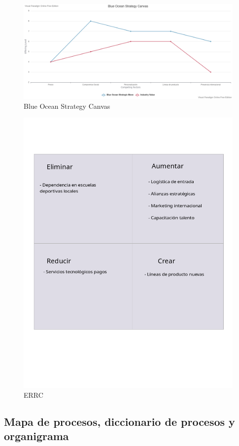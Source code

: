 \documentclass[11pt]{article}
\begin{document}
\begin{figure}[H]
\centering
\includegraphics[width=.9\linewidth]{./assets/build/blue_ocean_canvas.png}
\caption{\label{fig:blue_ocean}Blue Ocean Strategy Canvas}
\end{figure}
\begin{figure}[H]
\centering
\includegraphics[width=.9\linewidth]{./assets/build/ercc.png}
\caption{\label{fig:ercc}ERRC}
\end{figure}
\subsection{Mapa de procesos, diccionario de procesos y organigrama}
\label{sec:org80ff363}
\end{document}
